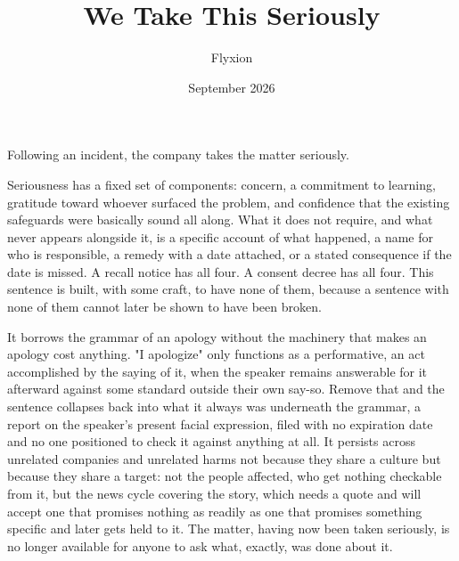 \documentclass[11pt]{article}
\title{We Take This Seriously}
\author{Flyxion}
\date{September 2026}
\begin{document}
\maketitle

Following an incident, the company takes the matter seriously.

Seriousness has a fixed set of components: concern, a commitment to learning, gratitude toward whoever surfaced the problem, and confidence that the existing safeguards were basically sound all along. What it does not require, and what never appears alongside it, is a specific account of what happened, a name for who is responsible, a remedy with a date attached, or a stated consequence if the date is missed. A recall notice has all four. A consent decree has all four. This sentence is built, with some craft, to have none of them, because a sentence with none of them cannot later be shown to have been broken.

It borrows the grammar of an apology without the machinery that makes an apology cost anything. "I apologize" only functions as a performative, an act accomplished by the saying of it, when the speaker remains answerable for it afterward against some standard outside their own say-so. Remove that and the sentence collapses back into what it always was underneath the grammar, a report on the speaker's present facial expression, filed with no expiration date and no one positioned to check it against anything at all. It persists across unrelated companies and unrelated harms not because they share a culture but because they share a target: not the people affected, who get nothing checkable from it, but the news cycle covering the story, which needs a quote and will accept one that promises nothing as readily as one that promises something specific and later gets held to it. The matter, having now been taken seriously, is no longer available for anyone to ask what, exactly, was done about it.
\end{document}
